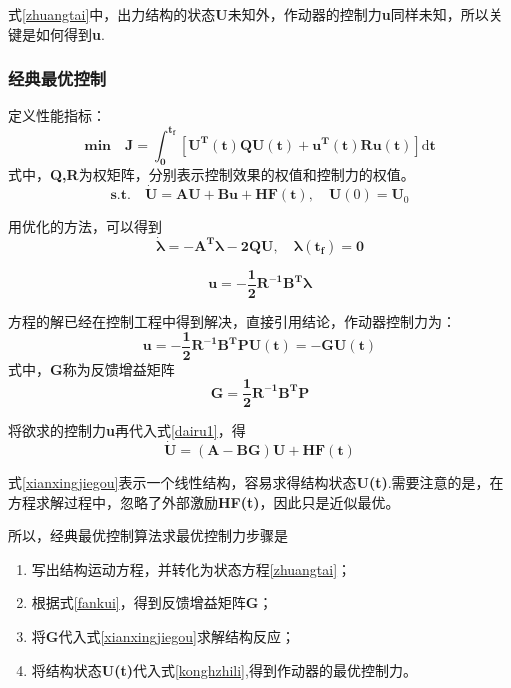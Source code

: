 式\eqref{zhuangtai}中，出力结构的状态\textbf{U}未知外，作动器的控制力\textbf{u}同样未知，所以关键是如何得到\textbf{u}.

\subsubsection{经典最优控制}
定义性能指标：
\begin{equation}
\mathbf{min\quad J=\int^{t_f}_0\left[U^T(t)QU(t)+u^T(t)Ru(t)\right]\mathrm{d}t}
\end{equation}
式中，\textbf{Q,R}为权矩阵，分别表示控制效果的权值和控制力的权值。
\begin{equation}
\mathbf{s.t.\quad} \dot{\mathbf{U}}=\mathbf{AU+Bu+HF(t)},\quad \mathbf{U}(0)=\mathbf{U}_0\label{dairu1}
\end{equation}

用优化的方法，可以得到
\begin{equation}
\dot{\mathbf{\lambda}}=\mathbf{-A^T\lambda-2QU,\quad \lambda(t_f)=0}
\end{equation}

\begin{equation}
\mathbf{u=-\frac{1}{2}R^{-1}B^T\lambda}
\end{equation}

方程的解已经在控制工程中得到解决，直接引用结论，作动器控制力为：
\begin{equation}
\mathbf{u=-\frac{1}{2}R^{-1}B^TPU(t)=-GU(t)} \label{konghzhili}
\end{equation}
式中，\textbf{G}称为反馈增益矩阵
\begin{equation}
\mathbf{G=\frac{1}{2}R^{-1}B^TP} \label{fankui}
\end{equation}

将欲求的控制力\textbf{u}再代入式\eqref{dairu1}，得
\begin{equation}
\dot{\mathbf{U}}=\mathbf{(A-BG)U+HF(t)}  \label{xianxingjiegou}
\end{equation}

式\eqref{xianxingjiegou}表示一个线性结构，容易求得结构状态\textbf{U(t)}.需要注意的是，在方程求解过程中，忽略了外部激励\textbf{HF(t)}，因此只是近似最优。

所以，经典最优控制算法求最优控制力步骤是
\begin{enumerate}
\item 写出结构运动方程，并转化为状态方程\eqref{zhuangtai}；
\item 根据式\eqref{fankui}，得到反馈增益矩阵\textbf{G}；
\item 将\textbf{G}代入式\eqref{xianxingjiegou}求解结构反应；
\item 将结构状态\textbf{U(t)}代入式\eqref{konghzhili},得到作动器的最优控制力。
\end{enumerate}
